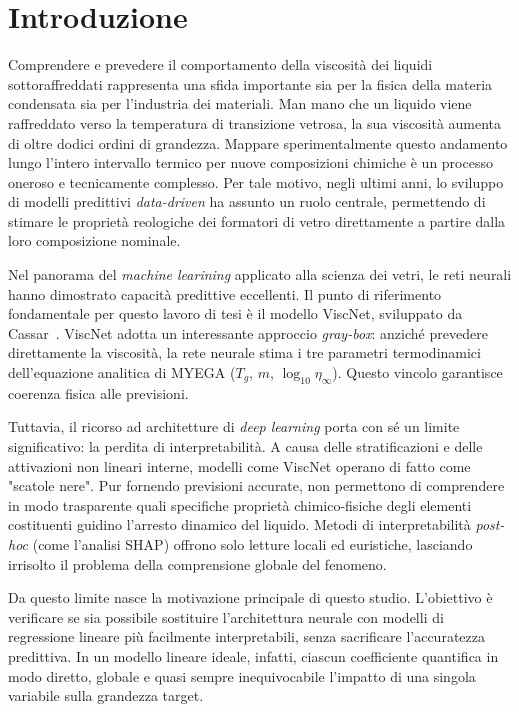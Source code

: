 \documentclass[../main.tex]{subfiles}
\begin{document}
	
	\chapter*{Introduzione}
	 
	
	Comprendere e prevedere il comportamento della viscosità dei liquidi sottoraffreddati rappresenta una sfida importante sia per la fisica della materia condensata sia per l'industria dei materiali. Man mano che un liquido viene raffreddato verso la temperatura di transizione vetrosa, la sua viscosità aumenta di oltre dodici ordini di grandezza. Mappare sperimentalmente questo andamento lungo l'intero intervallo termico per nuove composizioni chimiche è un processo oneroso e tecnicamente complesso. Per tale motivo, negli ultimi anni, lo sviluppo di modelli predittivi \textit{data-driven} ha assunto un ruolo centrale, permettendo di stimare le proprietà reologiche dei formatori di vetro direttamente a partire dalla loro composizione nominale.
	
	Nel panorama del \textit{machine learining} applicato alla scienza dei vetri, le reti neurali hanno dimostrato capacità predittive eccellenti. Il punto di riferimento fondamentale per questo lavoro di tesi è il modello ViscNet, sviluppato da Cassar~\cite{cassarViscNetNeuralNetwork2021}. ViscNet adotta un interessante approccio \textit{gray-box}: anziché prevedere direttamente la viscosità, la rete neurale stima i tre parametri termodinamici dell'equazione analitica di MYEGA ($T_g$, $m$, $\log_{10}\eta_\infty$). Questo vincolo garantisce coerenza fisica alle previsioni.
	
	Tuttavia, il ricorso ad architetture di \textit{deep learning} porta con sé un limite significativo: la perdita di interpretabilità. A causa delle stratificazioni e delle attivazioni non lineari interne, modelli come ViscNet operano di fatto come "scatole nere". Pur fornendo previsioni accurate, non permettono di comprendere in modo trasparente quali specifiche proprietà chimico-fisiche degli elementi costituenti guidino l'arresto dinamico del liquido. Metodi di interpretabilità \textit{post-hoc} (come l'analisi SHAP) offrono solo letture locali ed euristiche, lasciando irrisolto il problema della comprensione globale del fenomeno.
	
	Da questo limite nasce la motivazione principale di questo studio. L'obiettivo è verificare se sia possibile sostituire l'architettura neurale con modelli di regressione lineare più facilmente interpretabili, senza sacrificare l'accuratezza predittiva. In un modello lineare ideale, infatti, ciascun coefficiente quantifica in modo diretto, globale e quasi sempre inequivocabile l'impatto di una singola variabile sulla grandezza target.
	
\end{document}
